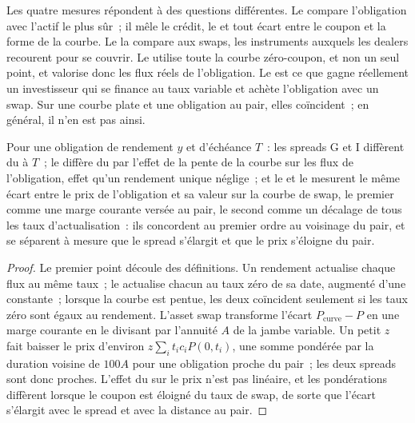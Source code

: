 Les quatre mesures répondent à des questions différentes. Le  compare l'obligation avec
l'actif le plus sûr~; il mêle le crédit, le  et tout écart entre le coupon et la
forme de la courbe. Le  la compare aux swaps, les instruments auxquels les dealers recourent pour
se couvrir. Le  utilise toute la courbe zéro-coupon, et non un seul point, et valorise donc
les flux réels de l'obligation. Le  est ce que gagne réellement un investisseur qui
se finance au taux variable et achète l'obligation avec un swap. Sur une courbe plate
et une obligation au pair, elles coïncident~; en général, il n'en est pas ainsi.

\begin{proposition}\label{prop:m2:corporate-bonds:differ}
Pour une obligation de rendement $y$ et d'échéance $T$~: les spreads G et I diffèrent
du  à $T$~; le  diffère du  par l'effet de
la pente de la courbe sur les flux de l'obligation, effet qu'un rendement unique néglige~; et le
 et le  mesurent le même écart entre le prix de l'obligation
et sa valeur sur la courbe de swap, le premier comme une marge courante versée au pair, le
second comme un décalage de tous les taux d'actualisation~: ils concordent au premier ordre au voisinage du pair, et
se séparent à mesure que le spread s'élargit et que le prix s'éloigne du pair.
\end{proposition}

\begin{proof}
Le premier point découle des définitions. Un rendement actualise chaque flux au même
taux~; le  actualise chacun au taux zéro de sa date, augmenté d'une constante~;
lorsque la courbe est pentue, les deux coïncident seulement si les taux zéro sont égaux au rendement.
L'asset swap transforme l'écart $P_{\mathrm{curve}} - P$ en une marge courante en le divisant par
l'annuité $A$ de la jambe variable. Un petit  $z$ fait baisser le prix
d'environ $z\sum_i t_i c_i P(0,t_i)$, une somme pondérée par la duration voisine de $100A$ pour une
obligation proche du pair~; les deux spreads sont donc proches. L'effet du  sur le prix n'est pas
linéaire, et les pondérations diffèrent lorsque le coupon est éloigné du taux de swap, de sorte que l'écart
s'élargit avec le spread et avec la distance au pair.
\end{proof}

